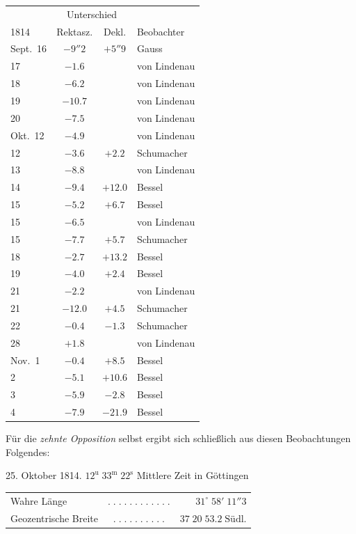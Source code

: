 \begin{center}
\fontsize{10}{12}\selectfont\setlength{\tabcolsep}{5pt}\renewcommand{\arraystretch}{1.15}\begin{tabular}{l|cc|l}
 & \multicolumn{2}{c|}{Unterschied} & \\
1814 & Rektasz. & Dekl. & Beobachter \\
\hline
Sept.\ 16 & $-9''2$ & $+5''9$ & Gauss \\
17 & $-1.6$ & & von Lindenau \\
18 & $-6.2$ & & von Lindenau \\
19 & $-10.7$ & & von Lindenau \\
20 & $-7.5$ & & von Lindenau \\
Okt.\ 12 & $-4.9$ & & von Lindenau \\
12 & $-3.6$ & $+2.2$ & Schumacher \\
13 & $-8.8$ & & von Lindenau \\
14 & $-9.4$ & $+12.0$ & Bessel \\
15 & $-5.2$ & $+6.7$ & Bessel \\
15 & $-6.5$ & & von Lindenau \\
15 & $-7.7$ & $+5.7$ & Schumacher \\
18 & $-2.7$ & $+13.2$ & Bessel \\
19 & $-4.0$ & $+2.4$ & Bessel \\
21 & $-2.2$ & & von Lindenau \\
21 & $-12.0$ & $+4.5$ & Schumacher \\
22 & $-0.4$ & $-1.3$ & Schumacher \\
28 & $+1.8$ & & von Lindenau \\
Nov.\ 1 & $-0.4$ & $+8.5$ & Bessel \\
2 & $-5.1$ & $+10.6$ & Bessel \\
3 & $-5.9$ & $-2.8$ & Bessel \\
4 & $-7.9$ & $-21.9$ & Bessel \\
\end{tabular}
\end{center}

\par\indent Für die \emph{zehnte Opposition} selbst ergibt sich schließlich aus diesen Beobachtungen Folgendes:

\begin{center}25. Oktober 1814. $12^{\mathrm u}\;33^{\mathrm m}\;22^{\mathrm s}$ Mittlere Zeit in Göttingen\end{center}
\begin{center}\fontsize{10}{12}\selectfont\setlength{\tabcolsep}{3pt}\renewcommand{\arraystretch}{1.15}\begin{tabular}{lcr}
Wahre Länge & $.\;.\;.\;.\;.\;.\;.\;.\;.\;.\;.\;.$ & $31^\circ\;58'\;11''3$\\
Geozentrische Breite & $.\;.\;.\;.\;.\;.\;.\;.\;.\;.$ & $37\;20\;53.2\;\mathrm{Südl.}$\\
\end{tabular}\end{center}

